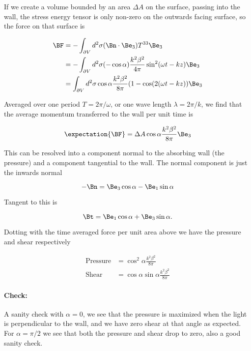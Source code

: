 If we create a volume bounded by an area $\Delta A$ on the surface, passing into the wall, the stress energy tensor is only non-zero on the outwards facing surface, so the force on that surface is

\begin{align*}
\BF 
&= - \int_{\partial V} d^2 \sigma (\Bn \cdot \Be_3) T^{3 3} \Be_3 \\
&= - \int_{\partial V} d^2 \sigma (-\cos\alpha) \frac{k^2 \beta^2}{4 \pi} \sin^2(\omega t - k z) \Be_3 \\
&= \int_{\partial V} d^2 \sigma \cos\alpha \frac{k^2 \beta^2}{8 \pi} (1 - \cos(2( \omega t - k z)) \Be_3 \\
\end{align*}

Averaged over one period $T = 2 \pi/\omega$, or one wave length $\lambda = 2 \pi/k$, we find that the average momentum transferred to the wall per unit time is

\begin{equation}\label{eqn:relativisticElectrodynamicsPS6P1:640}
\expectation{\BF} = \Delta A \cos\alpha \frac{k^2 \beta^2}{8 \pi} \Be_3 
\end{equation}

This can be resolved into a component normal to the absorbing wall (the pressure) and a component tangential to the wall.  The normal component is just the inwards normal

\begin{equation}\label{eqn:relativisticElectrodynamicsPS6P1:660}
-\Bn = \Be_3 \cos \alpha - \Be_1 \sin\alpha 
\end{equation}

Tangent to this is

\begin{equation}\label{eqn:relativisticElectrodynamicsPS6P1:680}
\Bt = \Be_1 \cos\alpha + \Be_3 \sin\alpha.
\end{equation}

Dotting with the time averaged force per unit area above we have the pressure and shear respectively

\begin{align}\label{eqn:relativisticElectrodynamicsPS6P1:700}
\text{Pressure} &= \cos^2\alpha \frac{k^2 \beta^2}{8 \pi} \\
\text{Shear} &= \cos\alpha \sin\alpha \frac{k^2 \beta^2}{8 \pi} 
\end{align}

\paragraph{Check:}

A sanity check with $\alpha = 0$, we see that the pressure is maximized when the light is perpendicular to the wall, and we have zero shear at that angle as expected.  For $\alpha = \pi/2$ we see that both the pressure and shear drop to zero, also a good sanity check.
